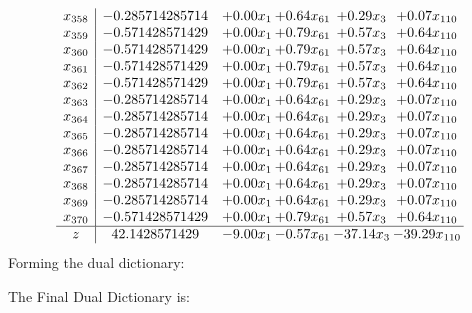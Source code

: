 \documentclass[8pt]{article}
\begin{document}
\[\begin{array}{c| c c@{\hskip 2pt} c@{\hskip 2pt} c@{\hskip 2pt} c@{\hskip 2pt} }
 x_{358}   &  -0.285714285714 & +  0.00 x_{1} & +  0.64 x_{61} & +  0.29 x_{3} & +  0.07 x_{110}\\
 x_{359}   &  -0.571428571429 & +  0.00 x_{1} & +  0.79 x_{61} & +  0.57 x_{3} & +  0.64 x_{110}\\
 x_{360}   &  -0.571428571429 & +  0.00 x_{1} & +  0.79 x_{61} & +  0.57 x_{3} & +  0.64 x_{110}\\
 x_{361}   &  -0.571428571429 & +  0.00 x_{1} & +  0.79 x_{61} & +  0.57 x_{3} & +  0.64 x_{110}\\
 x_{362}   &  -0.571428571429 & +  0.00 x_{1} & +  0.79 x_{61} & +  0.57 x_{3} & +  0.64 x_{110}\\
 x_{363}   &  -0.285714285714 & +  0.00 x_{1} & +  0.64 x_{61} & +  0.29 x_{3} & +  0.07 x_{110}\\
 x_{364}   &  -0.285714285714 & +  0.00 x_{1} & +  0.64 x_{61} & +  0.29 x_{3} & +  0.07 x_{110}\\
 x_{365}   &  -0.285714285714 & +  0.00 x_{1} & +  0.64 x_{61} & +  0.29 x_{3} & +  0.07 x_{110}\\
 x_{366}   &  -0.285714285714 & +  0.00 x_{1} & +  0.64 x_{61} & +  0.29 x_{3} & +  0.07 x_{110}\\
 x_{367}   &  -0.285714285714 & +  0.00 x_{1} & +  0.64 x_{61} & +  0.29 x_{3} & +  0.07 x_{110}\\
 x_{368}   &  -0.285714285714 & +  0.00 x_{1} & +  0.64 x_{61} & +  0.29 x_{3} & +  0.07 x_{110}\\
 x_{369}   &  -0.285714285714 & +  0.00 x_{1} & +  0.64 x_{61} & +  0.29 x_{3} & +  0.07 x_{110}\\
 x_{370}   &  -0.571428571429 & +  0.00 x_{1} & +  0.79 x_{61} & +  0.57 x_{3} & +  0.64 x_{110}\\
\hline
z    &  42.1428571429 & -9.00 x_{1} & -0.57 x_{61} & -37.14 x_{3} & -39.29 x_{110}\\
\end{array}\]
Forming the dual dictionary:

The Final Dual Dictionary is: 
\end{document}
